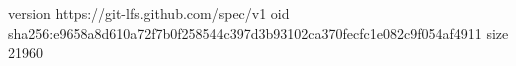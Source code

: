 version https://git-lfs.github.com/spec/v1
oid sha256:e9658a8d610a72f7b0f258544c397d3b93102ca370fecfc1e082c9f054af4911
size 21960
